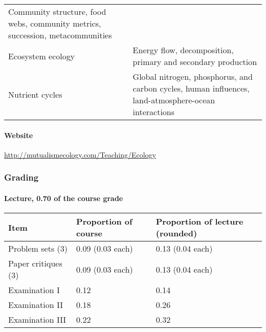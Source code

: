 \documentclass[]{article}
\let\oldparagraph\paragraph
\renewcommand{\paragraph}[1]{\oldparagraph{#1}\mbox{}}
\begin{document}
\begin{longtable}[]{@{}ll@{}}
\begin{minipage}[t]{0.78\columnwidth}
Community structure, food webs, community metrics, succession,
metacommunities\strut
\end{minipage}\tabularnewline
\begin{minipage}[t]{0.17\columnwidth}\raggedright\strut
Ecosystem ecology\strut
\end{minipage} & \begin{minipage}[t]{0.78\columnwidth}\raggedright\strut
Energy flow, decomposition, primary and secondary production\strut
\end{minipage}\tabularnewline
\begin{minipage}[t]{0.17\columnwidth}\raggedright\strut
Nutrient cycles\strut
\end{minipage} & \begin{minipage}[t]{0.78\columnwidth}\raggedright\strut
Global nitrogen, phosphorus, and carbon cycles, human influences,
land-atmosphere-ocean interactions\strut
\end{minipage}\tabularnewline
\bottomrule
\end{longtable}

\paragraph{Website}\label{website}

\href{http://mutualismecology.com/Teaching/IntroEco}{http://mutualismecology.com/Teaching/Ecology}

\subsubsection{Grading }\label{grading}

\paragraph{Lecture, 0.70 of the course
grade}\label{lecture-0.70-of-the-course-grade}

\begin{longtable}[]{@{}lll@{}}
\toprule
Item & Proportion of course & Proportion of lecture
(rounded)\tabularnewline
\midrule
\endhead
Problem sets (3) & 0.09 (0.03 each) & 0.13 (0.04 each)\tabularnewline
Paper critiques (3) & 0.09 (0.03 each) & 0.13 (0.04 each)\tabularnewline
Examination I & 0.12 & 0.14\tabularnewline
Examination II & 0.18 & 0.26\tabularnewline
Examination III & 0.22 & 0.32\tabularnewline
\bottomrule
\end{longtable}
\end{document}
